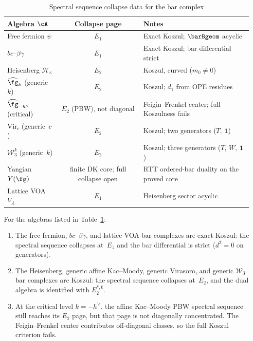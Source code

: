 \begin{table}[ht]
\centering
\caption{Spectral sequence collapse data for the bar complex}
\label{tab:spectral-data}
\renewcommand{\arraystretch}{1.4}
{\small
\begin{tabular}{|l|c|l|}
\hline
\textbf{Algebra $\cA$}
 & \textbf{Collapse page}
 & \textbf{Notes} \\
\hline
Free fermion $\psi$
 & $E_1$
 & Exact Koszul; $\barBgeom$ acyclic \\
\hline
$bc$--$\beta\gamma$
 & $E_1$
 & Exact Koszul; bar differential strict \\
\hline
Heisenberg $\mathcal{H}_\kappa$
 & $E_2$
 & Koszul, curved ($m_0 \ne 0$) \\
\hline
$\widehat{\fg}_k$ (generic~$k$)
 & $E_2$
 & Koszul; $d_1$ from OPE residues \\
\hline
$\widehat{\fg}_{-h^\vee}$ (critical)
 & $E_2$ \textup{(}PBW\textup{)}, not diagonal
 & Feigin--Frenkel center; full Koszulness fails \\
\hline
$\mathrm{Vir}_c$ (generic~$c$)
 & $E_2$
 & Koszul; two generators ($T$, $\mathbf{1}$) \\
\hline
$\mathcal{W}_3^k$ (generic~$k$)
 & $E_2$
 & Koszul; three generators ($T$, $W$, $\mathbf{1}$) \\
\hline
Yangian $Y(\fg)$
 & finite DK core; full collapse open
 & RTT ordered-bar duality on the proved core \\
\hline
Lattice VOA $V_\Lambda$
 & $E_1$
 & Heisenberg sector acyclic \\
\hline
\end{tabular}
}
\end{table}

\begin{proposition}
\label{prop:spectral-collapse-summary}
For the algebras listed in Table~\textup{\ref{tab:spectral-data}}:
\begin{enumerate}
\item The free fermion, $bc$--$\beta\gamma$, and lattice VOA
 bar complexes are exact Koszul: the spectral sequence collapses
 at~$E_1$ and the bar differential is strict ($d^2 = 0$ on generators).
\item The Heisenberg, generic affine Kac--Moody, generic Virasoro,
 and generic $\mathcal{W}_3$ bar complexes are Koszul: the spectral
 sequence collapses at~$E_2$, and the dual algebra is identified
 with $E_2^{*,0}$.
\item At the critical level $k = -h^\vee$, the affine Kac--Moody
 PBW spectral sequence still reaches its $E_2$ page, but that page is
 not diagonally concentrated. The Feigin--Frenkel center contributes
 off-diagonal classes, so the full Koszul criterion fails.
\end{enumerate}
\end{proposition}

